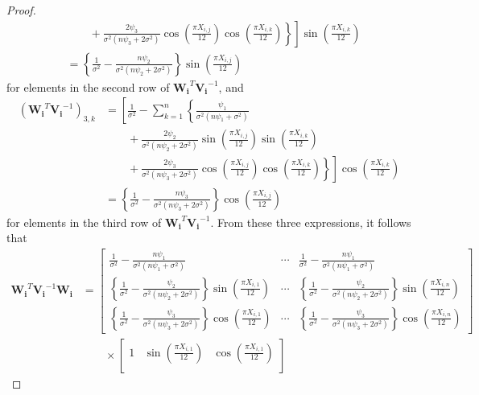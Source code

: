 \begin{proof}
\begin{align*}
    & \left. \left. \quad \quad + \frac{2\psi_3}{\sigma^2(n\psi_3+2\sigma^2)}\cos\left(\frac{\pi X_{i,j}}{12}\right)\cos\left(\frac{\pi X_{i,k}}{12}\right)\right\}\right]\sin\left( \frac{\pi X_{i,k}}{12}\right) \\
    &= \left\{\frac{1}{\sigma^2} - \frac{n\psi_2}{\sigma^2(n\psi_2+2\sigma^2)}\right\}\sin\left(\frac{\pi X_{i,j}}{12}\right)
\end{align*}
for elements in the second row of $\boldsymbol{W_i}^T\boldsymbol{V_i}^{-1}$, and
\begin{align*}
    \left(\boldsymbol{W_i}^T\boldsymbol{V_i}^{-1}\right)_{3,k} &= \left[\frac{1}{\sigma^2} -\sum_{k=1}^n\left\{ \frac{\psi_1}{\sigma^2(n\psi_1+\sigma^2)} \right. \right. \\
    & \left. \left. \quad \quad + \frac{2\psi_2}{\sigma^2(n\psi_2+2\sigma^2)}\sin\left(\frac{\pi X_{i,j}}{12}\right)\sin\left(\frac{\pi X_{i,k}}{12}\right) \right. \right. \\
    & \left. \left. \quad \quad + \frac{2\psi_3}{\sigma^2(n\psi_3+2\sigma^2)}\cos\left(\frac{\pi X_{i,j}}{12}\right)\cos\left(\frac{\pi X_{i,k}}{12}\right)\right\}\right]\cos\left( \frac{\pi X_{i,k}}{12}\right) \\
    &= \left\{\frac{1}{\sigma^2} - \frac{n\psi_3}{\sigma^2(n\psi_3+2\sigma^2)}\right\}\cos\left(\frac{\pi X_{i,j}}{12}\right)
\end{align*}
for elements in the third row of $\boldsymbol{W_i}^T\boldsymbol{V_i}^{-1}$. From these three expressions, it follows that
\begin{align}
\boldsymbol{W_i}^T\boldsymbol{V_i}^{-1}\boldsymbol{W_i} &= \begin{bmatrix} \frac{1}{\sigma^2} - \frac{n\psi_1}{\sigma^2(n\psi_1+\sigma^2)} & \cdots & \frac{1}{\sigma^2} - \frac{n\psi_1}{\sigma^2(n\psi_1+\sigma^2)} \\
 \left\{\frac{1}{\sigma^2} - \frac{\psi_2}{\sigma^2(n\psi_2+2\sigma^2)}\right\}\sin\left(\frac{\pi X_{i,1}}{12}\right) & \cdots & \left\{\frac{1}{\sigma^2} - \frac{\psi_2}{\sigma^2(n\psi_2+2\sigma^2)}\right\}\sin\left(\frac{\pi X_{i,n}}{12}\right) \\
 \left\{\frac{1}{\sigma^2} - \frac{\psi_3}{\sigma^2(n\psi_3+2\sigma^2)}\right\}\cos\left(\frac{\pi X_{i,1}}{12}\right) & \cdots & \left\{\frac{1}{\sigma^2} - \frac{\psi_3}{\sigma^2(n\psi_3+2\sigma^2)}\right\}\cos\left(\frac{\pi X_{i,n}}{12}\right)
\end{bmatrix} \nonumber \\
& \quad \quad \times 
\begin{bmatrix}1 & \sin\left(\frac{\pi X_{i,1}}{12}\right) & \cos\left(\frac{\pi X_{i,1}}{12}\right) \\

\end{bmatrix}
\end{align}
\end{proof}

